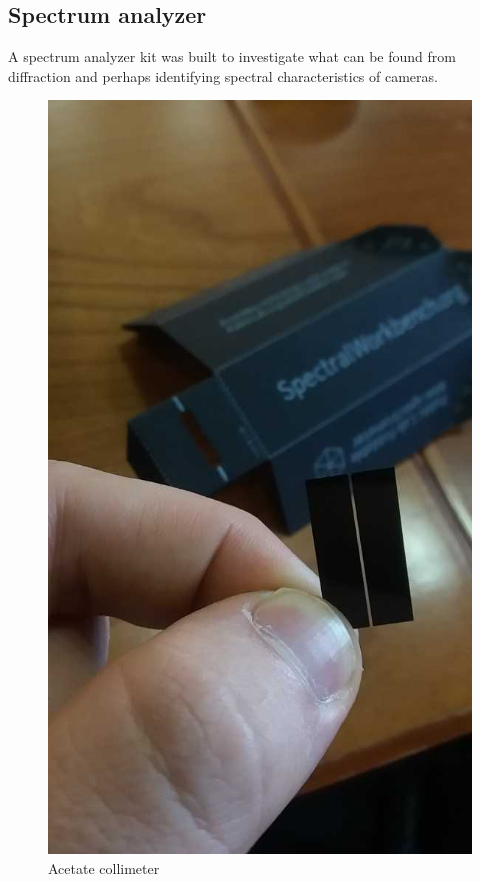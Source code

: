 \begin{appendices}
\chapter{Spectrum analyzer}

A spectrum analyzer kit was built to investigate what can be found from diffraction and perhaps identifying spectral characteristics of cameras.

\begin{figure}[H]
\centering
\includegraphics[scale=0.4]{images/collimeter.jpg}
\caption{Acetate collimeter}
\label{fig:coll}
\end{figure}


\end{appendices}
